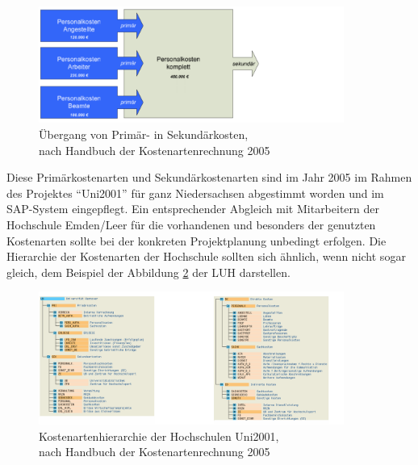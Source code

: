\begin{figure}[h!]
	\centering
	\includegraphics[width=10cm]{kapitel/gruppe4_2/bilder/uebergang_primaerkosten}
	\caption{Übergang von Primär- in Sekundärkosten,\\nach Handbuch der Kostenartenrechnung 2005}
	\label{fig_uebergang_primaerkosten}
\end{figure}

Diese Primärkostenarten und Sekundärkostenarten sind im Jahr 2005 im Rahmen des Projektes “Uni2001” für ganz Niedersachsen abgestimmt worden und im SAP-System eingepflegt. Ein entsprechender Abgleich mit Mitarbeitern der Hochschule Emden/Leer für die vorhandenen und besonders der genutzten Kostenarten sollte bei der konkreten Projektplanung unbedingt erfolgen. Die Hierarchie der Kostenarten der Hochschule sollten sich ähnlich, wenn nicht sogar gleich, dem Beispiel der Abbildung \ref{fig_kostenartenhierarchie_uni2001} der LUH darstellen.

\begin{figure}[h!]
	\centering
	\includegraphics[width=10cm]{kapitel/gruppe4_2/bilder/kostenartenhierarchie_uni2001}
	\caption{Kostenartenhierarchie der Hochschulen Uni2001,\\nach Handbuch der Kostenartenrechnung 2005}
	\label{fig_kostenartenhierarchie_uni2001}
\end{figure}